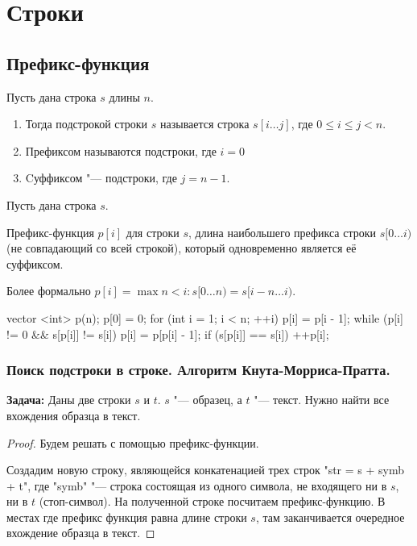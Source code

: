 \chapter{Строки}
\section{Префикс-функция} 

\begin{Def}
Пусть дана строка $s$ длины $n$. 
\begin{enumerate}
\item Тогда подстрокой строки $s$ называется строка $s[i \dots j]$, где $0 \le i \le j < n$.
\item Префиксом называются подстроки, где $i = 0$
\item Cуффиксом "--- подстроки, где $j = n - 1$.
\end{enumerate}
\end{Def}

\begin{Def}
Пусть дана строка $s$. 

Префикс-функция $p[i]$ для строки $s$, длина наибольшего префикса строки $s[0 \dots i)$(не совпадающий со всей строкой), который одновременно является её суффиксом.

Более формально $p[i] = \max n < i \colon s[0 \dots n) = s[i - n \dots i)$.
\end{Def}

\begin{cppcode}
vector <int> p(n);
p[0] = 0;
for (int i = 1; i < n; ++i) {
    p[i] = p[i - 1];
    while (p[i] != 0 && s[p[i]] != s[i]) {
        p[i] = p[p[i] - 1];
    }
    if (s[p[i]] == s[i]) ++p[i];
} 
\end{cppcode}

\subsection{Поиск подстроки в строке. Алгоритм Кнута-Морриса-Пратта.}

\textbf{Задача: }Даны две строки $s$ и $t$. $s$ "--- образец, а $t$ "--- текст. 
Нужно найти все вхождения образца в текст. 

\begin{proof}
Будем решать с помощью префикс-функции. 

Создадим новую строку, являющейся конкатенацией трех строк \cpp"str = s + symb + t", где 
\cpp"symb" "--- строка состоящая из одного символа, не входящего ни в $s$, ни в $t$ (стоп-символ). 
На полученной строке посчитаем префикс-функцию. 
В местах где префикс функция равна длине строки $s$, там заканчивается очередное вхождение образца в текст.
\end{proof}

